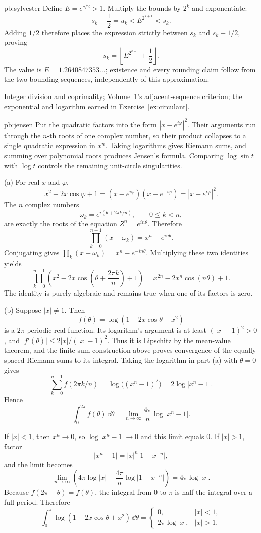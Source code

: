 \begin{solution}{pb:sylvester}
Define $E=e^{c/2}>1$. Multiply the bounds by $2^k$ and exponentiate:
\[
s_k-\frac12=u_k<E^{2^{k+1}}<s_k.
\]
Adding $1/2$ therefore places the expression strictly between $s_k$ and
$s_k+1/2$, proving
\[
\boxed{s_k=\left\lfloor E^{2^{k+1}}+\frac12\right\rfloor}.
\]
The value is $E=1.2640847353\ldots$; existence and every rounding claim
follow from the two bounding sequences, independently of this approximation.

\tools Integer division and coprimality; Volume~1's adjacent-sequence criterion; the exponential and logarithm earned in Exercise~\ref{ex:circulant}.
\end{solution}

\begin{solution}{pb:jensen}
\idea Put the quadratic factors into the form $|x-e^{i\varphi}|^2$. Their arguments run through the $n$-th roots of one complex number, so their product collapses to a single quadratic expression in $x^n$. Taking logarithms gives Riemann sums, and summing over polynomial roots produces Jensen's formula. Comparing $\log\sin t$ with $\log t$ controls the remaining unit-circle singularities.

\writeup (a) For real $x$ and $\varphi$,
\[
x^2-2x\cos\varphi+1
=(x-e^{i\varphi})(x-e^{-i\varphi})
=|x-e^{i\varphi}|^2.
\]
The $n$ complex numbers
\[
\omega_k=e^{i(\theta+2\pi k/n)},\qquad 0\le k<n,
\]
are exactly the roots of the equation $Z^n=e^{in\theta}$. Therefore
\[
\prod_{k=0}^{n-1}(x-\omega_k)=x^n-e^{in\theta}.
\]
Conjugating gives $\prod_k(x-\bar\omega_k)=x^n-e^{-in\theta}$. Multiplying these two identities yields
\[
\boxed{\prod_{k=0}^{n-1}
\left(x^2-2x\cos\left(\theta+\frac{2\pi k}{n}\right)+1\right)
=x^{2n}-2x^n\cos(n\theta)+1}.
\]
The identity is purely algebraic and remains true when one of its factors is zero.

(b) Suppose $|x|\ne1$. Then
\[
f(\theta)=\log(1-2x\cos\theta+x^2)
\]
is a $2\pi$-periodic real function. Its logarithm's argument is at least $(|x|-1)^2>0$, and $|f'(\theta)|\le2|x|/(|x|-1)^2$. Thus it is Lipschitz by the mean-value theorem, and the finite-sum construction above proves convergence of the equally spaced Riemann sums to its integral. Taking the logarithm in part (a) with $\theta=0$ gives
\[
\sum_{k=0}^{n-1}f(2\pi k/n)
=\log\bigl((x^n-1)^2\bigr)
=2\log|x^n-1|.
\]
Hence
\[
\int_0^{2\pi}f(\theta)\,\dd\theta
=\lim_{n\to\infty}\frac{4\pi}{n}\log|x^n-1|.
\]

If $|x|<1$, then $x^n\to0$, so $\log|x^n-1|\to0$ and this limit equals $0$. If $|x|>1$, factor
\[
|x^n-1|=|x|^n|1-x^{-n}|,
\]
and the limit becomes
\[
\lim_{n\to\infty}\left(4\pi\log|x|+\frac{4\pi}{n}\log|1-x^{-n}|\right)
=4\pi\log|x|.
\]
Because $f(2\pi-\theta)=f(\theta)$, the integral from $0$ to $\pi$ is half the integral over a full period. Therefore
\[
\boxed{\int_0^\pi\log(1-2x\cos\theta+x^2)\,\dd\theta=
\begin{cases}
0,&|x|<1,\\
2\pi\log|x|,&|x|>1.
\end{cases}}
\]


\end{solution}
